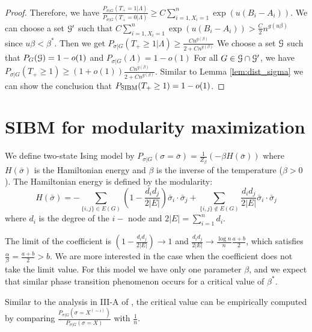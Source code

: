 \documentclass{article}
\begin{document}
\begin{proof}
	Therefore, we have $\frac{P_{\sigma | G}(T_+ = 1 | \Lambda ) }{P_{\sigma | G}(T_+ = 0 | \Lambda )} \geq C\sum_{i=1, X_i=1}^n \exp(u(B_i - A_i))$.
	We can choose a set $\mathcal{G}'$ such that $C\sum_{i=1, X_i=1}^n \exp(u(B_i - A_i)) > \frac{C}{2}n^{g(u\beta)}$ since $u\beta < \beta^*$.
	Then we get $P_{\sigma | G}(T_+\geq 1 | \Lambda) \geq \frac{Cn^{g(\beta)}}{2 + C n^{g(\beta)}} $
	We choose a set $\mathcal{G}$ such that $P_G(\mathcal{G}) = 1-o(1)$ and
	$ P_{\sigma|G} (\Lambda)
	=1- o(1)
	$
	For all $G \in \mathcal{G} \cap \mathcal{G}'$, we have $P_{\sigma | G}(T_+ \geq 1) \geq (1+o(1)) \frac{Cn^{g(\beta)}}{2 + C n^{g(\beta)}}$.
	Similar to Lemma \ref{lem:dist_sigma} we can show the conclusion that $P_{\operatorname{SIBM}}(T_+ \geq 1) = 1-o(1)$.
\end{proof}
\section{SIBM for modularity maximization}
We define two-state Ising model by $P_{\sigma | G}(\sigma=\bar{\sigma}) = \frac{1}{Z_{\beta}}(-\beta H(\bar{\sigma}))$
where $H(\bar{\sigma})$ is the Hamiltonian energy and $\beta$ is the inverse of the temperature ($\beta>0$).
The Hamiltonian energy is defined by the modularity:
\begin{equation}
H(\bar{\sigma}) = - \sum_{\{i,j\} \in E(G) } (1-\frac{d_id_j}{2|E|} )\bar{\sigma}_i \cdot \bar{\sigma}_j + \sum_{\{i,j\} \not\in E(G) }\frac{d_id_j}{2|E|}  \bar{\sigma}_i \cdot \bar{\sigma}_j
\end{equation}
where $d_i$ is the degree of the $i-$ node and $2|E|=\sum_{i=1}^n d_i$.

The limit of the coefficient is $(1-\frac{d_id_j}{2|E|} ) \to 1$ and $\frac{d_id_j}{2|E|} \to \frac{\log n}{n} \frac{a+b}{2}$, which satisfies
$\frac{\alpha}{\beta}  = \frac{a+b}{2} > b$. We are more interested in the case when the coefficient does not take the limit value.
For this model we have only one parameter $\beta$, and we expect that similar phase transition phenomenon occurs for a critical value of $\beta^*$.

Similar to the analysis in III-A of \cite{ye2020exact}, the critical value can be empirically computed by comparing
$\frac{P_{\sigma | G}(\sigma = X^{(\sim i)})}{P_{\sigma |G}(\sigma = X)}$ with $\frac{1}{n}$.
\end{document}
